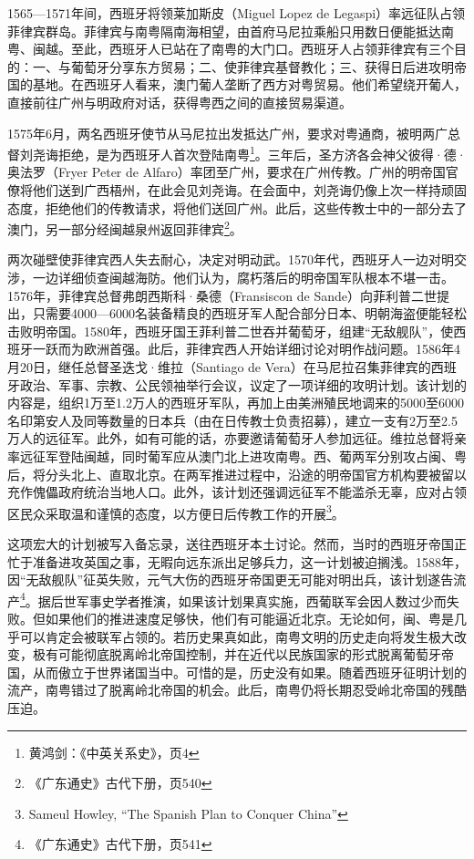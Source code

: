 1565—1571年间，西班牙将领莱加斯皮（Miguel Lopez de Legaspi）率远征队占领菲律宾群岛。菲律宾与南粤隔南海相望，由首府马尼拉乘船只用数日便能抵达南粤、闽越。至此，西班牙人已站在了南粤的大门口。西班牙人占领菲律宾有三个目的：一、与葡萄牙分享东方贸易；二、使菲律宾基督教化；三、获得日后进攻明帝国的基地。在西班牙人看来，澳门葡人垄断了西方对粤贸易。他们希望绕开葡人，直接前往广州与明政府对话，获得粤西之间的直接贸易渠道。

1575年6月，两名西班牙使节从马尼拉出发抵达广州，要求对粤通商，被明两广总督刘尧诲拒绝，是为西班牙人首次登陆南粤\footnote{黄鸿剑：《中英关系史》，页4}。三年后，圣方济各会神父彼得·德·奥法罗（Fryer Peter de Alfaro）率团至广州，要求在广州传教。广州的明帝国官僚将他们送到广西梧州，在此会见刘尧诲。在会面中，刘尧诲仍像上次一样持顽固态度，拒绝他们的传教请求，将他们送回广州。此后，这些传教士中的一部分去了澳门，另一部分经闽越泉州返回菲律宾\footnote{《广东通史》古代下册，页540}。

两次碰壁使菲律宾西人失去耐心，决定对明动武。1570年代，西班牙人一边对明交涉，一边详细侦查闽越海防。他们认为，腐朽落后的明帝国军队根本不堪一击。1576年，菲律宾总督弗朗西斯科·桑德（Fransiscon de Sande）向菲利普二世提出，只需要4000—6000名装备精良的西班牙军人配合部分日本、明朝海盗便能轻松击败明帝国。1580年，西班牙国王菲利普二世吞并葡萄牙，组建“无敌舰队”，使西班牙一跃而为欧洲首强。此后，菲律宾西人开始详细讨论对明作战问题。1586年4月20日，继任总督圣迭戈·维拉（Santiago de Vera）在马尼拉召集菲律宾的西班牙政治、军事、宗教、公民领袖举行会议，议定了一项详细的攻明计划。该计划的内容是，组织1万至1.2万人的西班牙军队，再加上由美洲殖民地调来的5000至6000名印第安人及同等数量的日本兵（由在日传教士负责招募），建立一支有2万至2.5万人的远征军。此外，如有可能的话，亦要邀请葡萄牙人参加远征。维拉总督将亲率远征军登陆闽越，同时葡军应从澳门北上进攻南粤。西、葡两军分别攻占闽、粤后，将分头北上、直取北京。在两军推进过程中，沿途的明帝国官方机构要被留以充作傀儡政府统治当地人口。此外，该计划还强调远征军不能滥杀无辜，应对占领区民众采取温和谨慎的态度，以方便日后传教工作的开展\footnote{Sameul Howley, “The Spanish Plan to Conquer China”}。

这项宏大的计划被写入备忘录，送往西班牙本土讨论。然而，当时的西班牙帝国正忙于准备进攻英国之事，无暇向远东派出足够兵力，这一计划被迫搁浅。1588年，因“无敌舰队”征英失败，元气大伤的西班牙帝国更无可能对明出兵，该计划遂告流产\footnote{《广东通史》古代下册，页541}。据后世军事史学者推演，如果该计划果真实施，西葡联军会因人数过少而失败。但如果他们的推进速度足够快，他们有可能逼近北京。无论如何，闽、粤是几乎可以肯定会被联军占领的。若历史果真如此，南粤文明的历史走向将发生极大改变，极有可能彻底脱离岭北帝国控制，并在近代以民族国家的形式脱离葡萄牙帝国，从而傲立于世界诸国当中。可惜的是，历史没有如果。随着西班牙征明计划的流产，南粤错过了脱离岭北帝国的机会。此后，南粤仍将长期忍受岭北帝国的残酷压迫。

